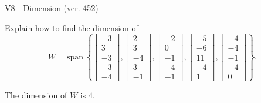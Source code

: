 \begin{exercise}
  \begin{exerciseTitle}V8 - Dimension (ver. 452)\end{exerciseTitle}
  \begin{exerciseStatement}
    Explain how to find the dimension of 
\[W=\mathrm{span}\ \left\{\left[\begin{array}{r}
-3 \\
3 \\
-3 \\
-3 \\
-4
\end{array}\right] , \left[\begin{array}{r}
2 \\
3 \\
-4 \\
3 \\
-1
\end{array}\right] , \left[\begin{array}{r}
-2 \\
0 \\
-1 \\
-4 \\
-1
\end{array}\right] , \left[\begin{array}{r}
-5 \\
-6 \\
11 \\
-4 \\
1
\end{array}\right] , \left[\begin{array}{r}
-4 \\
-4 \\
-1 \\
-4 \\
0
\end{array}\right]\right\}.\]



  \end{exerciseStatement}
  \begin{exerciseAnswer}
   The dimension of \(W\) is  \(4\).
  


  \end{exerciseAnswer}
\end{exercise}